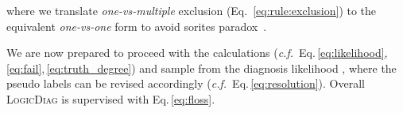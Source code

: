 \documentclass[10pt,twocolumn,letterpaper]{article}
\def\Ours{{\textsc{LogicDiag}}}
\begin{document}
where we translate \textit{one-vs-multiple} exclusion (Eq.~\ref{eq:rule:exclusion}) to the\\ equivalent \textit{one-vs-one} form to avoid sorites paradox~\cite{goguen1969logic}.

We are now prepared to proceed with the calculations (\textit{c.f.\!}~Eq.\,\ref{eq:likelihood},\,\ref{eq:fail},\,\ref{eq:truth_degree}) and sample from the diagnosis likelihood , where the pseudo labels can be revised accordingly (\textit{c.f.\!}~Eq.\,\ref{eq:resolution}). Overall {\Ours} is supervised with Eq.\,\ref{eq:floss}.


\newcommand{\reshl}[2]{
{#1} \fontsize{7.5pt}{1em}\selectfont\color{mygreen}{ {#2}}
}
\newcommand{\reshlb}[2]{
\textbf{#1} \fontsize{7.5pt}{1em}\selectfont\color{mygreen}{ \textbf{#2}}
}
\begin{table*}[t]
   \centering\small
\end{table*}
\end{document}
